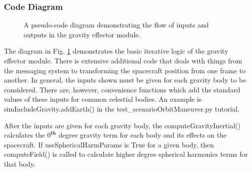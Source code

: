 \subsubsection{Code Diagram}

\begin{figure}[H]
	\caption{A pseudo-code diagram demonstrating the flow of inputs and outputs in the gravity effector module.}
	\label{img:codeFlow}
\end{figure}

The diagram in Fig. \ref{img:codeFlow} demonstrates the basic iterative logic of the gravity effector module. There is extensive additional code that deals with things from the messaging system to transforming the spacecraft position from one frame to another. In general, the inputs shown must be given for each gravity body to be considered. There are, however, convenience functions which add the standard values of these inputs for common celestial bodies. An example is simIncludeGravity.addEarth() in the test\_scenarioOrbitManeuver.py tutorial.

After the inputs are given for each gravity body, the computeGravityInertial() calculates the $0^{\textbf{th}}$ degree gravity term for each body and its effects on the spacecraft. If useSphericalHarmParams is True for a given body, then computeField() is called to calculate higher degree spherical harmonics terms for that body.
